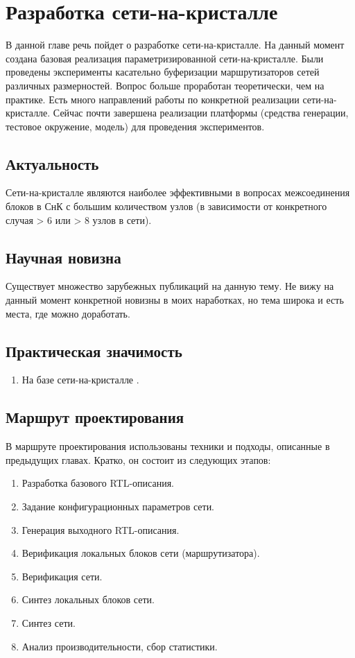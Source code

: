 
\chapter{Разработка сети-на-кристалле}

В данной главе речь пойдет о разработке сети-на-кристалле. На данный момент создана базовая реализация параметризированной сети-на-кристалле. Были проведены эксперименты касательно буферизации маршрутизаторов сетей различных размерностей. Вопрос больше проработан теоретически, чем на практике. Есть много направлений работы по конкретной реализации сети-на-кристалле. Сейчас почти завершена реализации платформы (средства генерации, тестовое окружение, модель) для проведения экспериментов.

\section{Актуальность}

Сети-на-кристалле являются наиболее эффективными в вопросах межсоединения блоков в СнК с большим количеством узлов (в зависимости от конкретного случая > 6 или > 8 узлов в сети).

\section{Научная новизна}

Существует множество зарубежных публикаций на данную тему. Не вижу на данный момент конкретной новизны в моих наработках, но тема широка и есть места, где можно доработать.

\section{Практическая значимость}

\begin{enumerate}
  \item На базе сети-на-кристалле .
\end{enumerate}

\section{Маршрут проектирования}

В маршруте проектирования использованы техники и подходы, описанные в предыдущих главах. Кратко, он состоит из следующих этапов:

\begin{enumerate}
  \item Разработка базового RTL-описания.
  \item Задание конфигурационных параметров сети.
  \item Генерация выходного RTL-описания.
  \item Верификация локальных блоков сети (маршрутизатора).
  \item Верификация сети.
  \item Синтез локальных блоков сети.
  \item Синтез сети.
  \item Анализ производительности, сбор статистики.
\end{enumerate}


